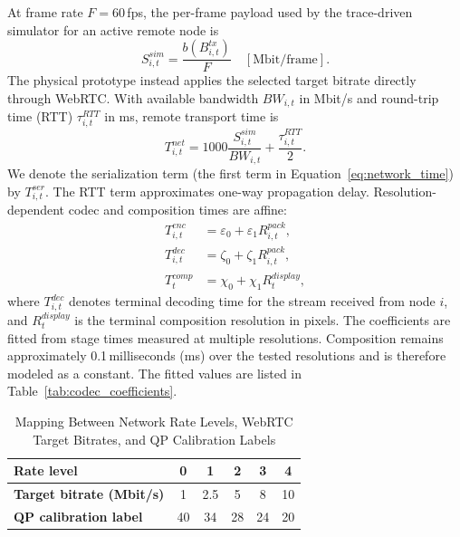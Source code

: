 \documentclass[10pt,journal,compsoc]{IEEEtran}
\begin{document}
At frame rate $F=60$\,fps, the per-frame payload used by the trace-driven simulator for an active remote node is
\begin{equation}
	S^{sim}_{i,t}=\frac{b(B^{tx}_{i,t})}{F}
	\quad[\mathrm{Mbit/frame}].
	\label{eq:payload}
\end{equation}
The physical prototype instead applies the selected target bitrate directly through WebRTC. With available bandwidth $BW_{i,t}$ in Mbit/s and round-trip time (RTT) $\tau^{RTT}_{i,t}$ in ms, remote transport time is
\begin{equation}
	T^{net}_{i,t}=1000\frac{S^{sim}_{i,t}}{BW_{i,t}}+\frac{\tau^{RTT}_{i,t}}{2}.
	\label{eq:network_time}
\end{equation}
We denote the serialization term (the first term in Equation~\ref{eq:network_time}) by $T^{ser}_{i,t}$. The RTT term approximates one-way propagation delay. Resolution-dependent codec and composition times are affine:
\begin{align}
	T^{enc}_{i,t}&=\varepsilon_0+\varepsilon_1R^{pack}_{i,t},\\
	T^{dec}_{i,t}&=\zeta_0+\zeta_1R^{pack}_{i,t},\\
	T^{comp}_{t}&=\chi_0+\chi_1R^{display}_{t},
	\label{eq:codec_comp_time}
\end{align}
where $T^{dec}_{i,t}$ denotes terminal decoding time for the stream received from node $i$, and $R^{display}_{t}$ is the terminal composition resolution in pixels. The coefficients are fitted from stage times measured at multiple resolutions. Composition remains approximately 0.1\,milliseconds (ms) over the tested resolutions and is therefore modeled as a constant. The fitted values are listed in Table~\ref{tab:codec_coefficients}.

\begin{table}[t]
	\centering
	\caption{Mapping Between Network Rate Levels, WebRTC Target Bitrates, and QP Calibration Labels}
	\label{tab:qp_rate_map}
	\footnotesize
	\renewcommand{\arraystretch}{1.05}
	\begin{tabular*}{\columnwidth}{@{\extracolsep{\fill}}lccccc@{}}
		\toprule
		\textbf{Rate level} & 0 & 1 & 2 & 3 & 4 \\
		\midrule
		\textbf{Target bitrate (Mbit/s)} & 1 & 2.5 & 5 & 8 & 10 \\
		\textbf{QP calibration label} & 40 & 34 & 28 & 24 & 20 \\
		\bottomrule
	\end{tabular*}
\end{table}
\end{document}
